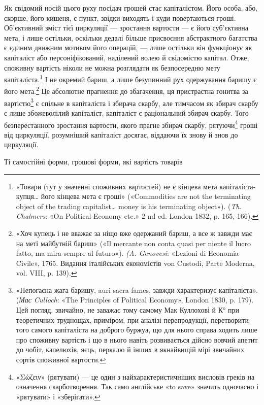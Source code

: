 Як свідомий носій цього руху посідач грошей стає капіталістом.
Його особа, або, скорше, його кишеня, є пункт, звідки виходять
і куди повертаються гроші. Об’єктивний зміст тієї циркуляції
— зростання вартости — є його суб’єктивна мета, і лише
остільки, оскільки дедалі більше присвоєння абстрактного багатства
є єдиним движним мотивом його операцій, — лише остільки
він функціонує як капіталіст або персоніфікований, наділений
волею й свідомістю капітал. Отже, споживну вартість ніколи не
можна розглядати як безпосередню мету капіталіста.\footnote{
«Товари (тут у значенні споживних вартостей) не є кінцева мета
капіталіста-купця\dots{} його кінцева мета є гроші» («Commodities are
not the terminating object of the trading capitalist\dots{} money is his terminating
object»). (\emph{Th. Chalmers}: «On Political Economy etc.» 2 nd ed. London
1832, p. 165, 166).
} І не окремий
бариш, а лише безупинний рух одержування баришу є його
мета.\footnote{
«Хоч купець і не вважає за ніщо вже одержаний бариш, а все ж
завжди має на меті майбутній бариш» («Il mercante non conta quasi per
niente il lucro fatto, ma mira sempre al futuro»). \emph{(A. Genovesi}: «Lezioni
di Economia Civile», 1765. Видання італійських економістів von Custodi,
Parte Moderna, vol. VIII, p. 139).
} Це абсолютне прагнення до збагачення, ця пристрастна
гонитва за вартістю\footnote{
«Непогасна жага баришу, auri sacra fames, завжди характеризує
капіталіста». (\emph{Мас Culloch}: «The Principles of Political Economy»,
London 1830, p. 179). Цей погляд, звичайно, не заважає тому самому
Мак Куллохові й К° при теоретичних труднощах, приміром, при аналізі
перепродукції, перетворити того самого капіталіста на доброго буржуа,
що для нього справа ходить лише про споживну вартість і що в нього
навіть розвивається дійсно вовчий апетит до чобіт, капелюхів, яєць,
перкалю й інших в якнайвищій мірі звичайних сортів споживної вартости.
} є спільне в капіталіста і збирача скарбу,
але тимчасом як збирач скарбу є лише збожеволілий капіталіст,
капіталіст є раціональний збирач скарбу. Того безперестанного
зростання вартости, якого прагне збирач скарбу, рятуючи\footnote{
«\textgreek{Σώζειν}» (рятувати) — це один з найхарактеристичніших висловів
греків на означення скарботворення. Так само англійське «to save» значить
одночасно і «рятувати» і «зберігати».
} гроші від циркуляції, розумніший капіталіст досягає, віддаючи їх знову
й знов до циркуляції.

Ті самостійні форми, грошові форми, які вартість товарів
\parbreak{}  %
